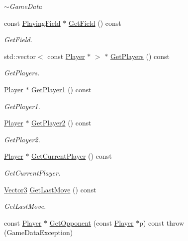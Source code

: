 \begin{DoxyCompactItemize}
\begin{DoxyCompactList}\small\item\em $\sim$\-Game\-Data \end{DoxyCompactList}\item 
const \hyperlink{classPlayingField}{Playing\-Field} $\ast$ \hyperlink{classGameData_af932f66030087c333f2d5746f9fd555c}{Get\-Field} () const 
\begin{DoxyCompactList}\small\item\em Get\-Field. \end{DoxyCompactList}\item 
std\-::vector$<$ const \hyperlink{classPlayer}{Player} $\ast$ $>$ $\ast$ \hyperlink{classGameData_a423674f3ce9e6283b7262a9187ee0449}{Get\-Players} () const 
\begin{DoxyCompactList}\small\item\em Get\-Players. \end{DoxyCompactList}\item 
\hyperlink{classPlayer}{Player} $\ast$ \hyperlink{classGameData_a1642c300ee35687a67b807cedee9e55d}{Get\-Player1} () const 
\begin{DoxyCompactList}\small\item\em Get\-Player1. \end{DoxyCompactList}\item 
\hyperlink{classPlayer}{Player} $\ast$ \hyperlink{classGameData_aa9012da90297a55f563a20f0b927b051}{Get\-Player2} () const 
\begin{DoxyCompactList}\small\item\em Get\-Player2. \end{DoxyCompactList}\item 
\hyperlink{classPlayer}{Player} $\ast$ \hyperlink{classGameData_a5e07bca98788c169c82e0e0f393755a7}{Get\-Current\-Player} () const 
\begin{DoxyCompactList}\small\item\em Get\-Current\-Player. \end{DoxyCompactList}\item 
\hyperlink{structVector3}{Vector3} \hyperlink{classGameData_a5c754d78e1521b2b32b53a083d5cf7f5}{Get\-Last\-Move} () const 
\begin{DoxyCompactList}\small\item\em Get\-Last\-Move. \end{DoxyCompactList}\item 
const \hyperlink{classPlayer}{Player} $\ast$ \hyperlink{classGameData_a7cf443182a19f49bac785f7224d57d81}{Get\-Opponent} (const \hyperlink{classPlayer}{Player} $\ast$p) const   throw (\-Game\-Data\-Exception)

\end{DoxyCompactItemize}
